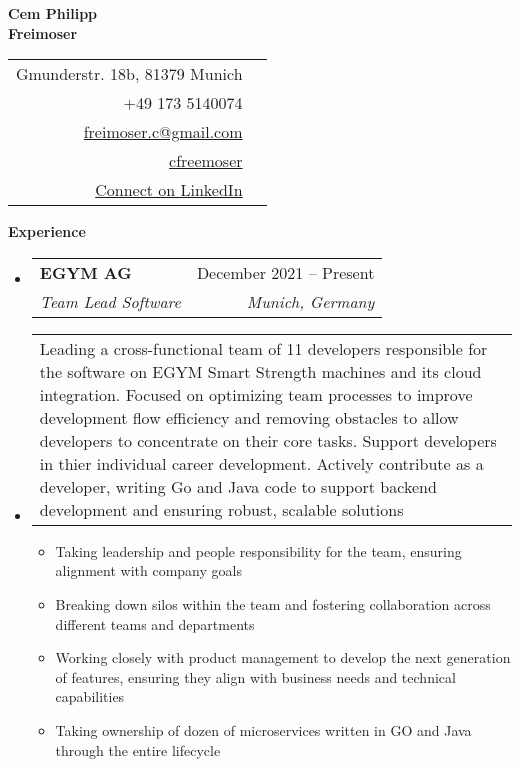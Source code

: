 \documentclass[letterpaper,12pt]{article}
\makeatletter
\def \firstname {Cem Philipp}
\def \lastname {Freimoser}
\def \linkedinicon {\faLinkedin}
\def \linkedintext {/dwight-schrute}
\def \homeicon {\faHome}
\def \hometext {Gmunderstr. 18b, 81379 Munich}
\def \phoneicon {\faPhone}
\def \phonetext {+49 173 5140074}
\def \emailicon {\faEnvelope}
\def \emaillink {mailto:freimoser.c@gmail.com}
\def \emailtext {freimoser.c@gmail.com}
\def \githubicon {\faGithub}
\def \githublink {https://github.com/cfreemoser}
\def \githubtext {cfreemoser}
\def \linkedinicon {\faLinkedin}
\def \linkedlink {https://www.linkedin.com/in/cem-philipp-freimoser-3b885011b/}
\def \linkedintext {Connect on LinkedIn}
\def \entryspacing {-0pt}
\def \phone {\phonetext \hspace{3pt}\phoneicon}
\def \email {\href{\emaillink}{\emailtext} \hspace{3pt}\emailicon}
\def \github {\href{\githublink}{\githubtext} \hspace{3pt}\githubicon}
\def \home {\hometext \hspace{3pt}\homeicon}
\def \linkedin {\href{\linkedlink}{\linkedintext} \hspace{3pt}\linkedinicon}
\renewcommand{\section}[2]{\vspace{5pt}
  \colorbox{teriary}{\color{white}\raggedbottom\normalsize\textbf{{#1}{\hspace{7pt}#2}}}
}
\newcommand{\resumeEntryStart}{\begin{itemize}[leftmargin=2.5mm]}
\newcommand{\resumeEntryEnd}{\end{itemize}\vspace{\entryspacing}}
\newcommand{\resumeItemListStart}{\begin{itemize}[leftmargin=4.5mm]}
\newcommand{\resumeItemListEnd}{\end{itemize}}
\newcommand{\resumeItem}[1]{
  \item\small{
    {#1 \vspace{-2pt}}
  }
}
\newcommand{\resumeEntryTSDL}[4]{
  \vspace{-1pt}\item[]
    \begin{tabularx}{0.97\textwidth}{X@{\hspace{60pt}}r}
      \textbf{\color{primary}#1} & {\color{accent}\small#2} \\
      \textit{\color{accent}\small#3} & \textit{\color{accent}\small#4} \\
    \end{tabularx}\vspace{-6pt}
}
\newcommand{\resumeEntryDesc}[1]{
  \vspace{-1pt}\item[] 
  \small{
    \begin{tabularx}{0.97\textwidth}{X}
      #1
    \end{tabularx}
  }
  \vspace{-6pt}
}
\makeatother
\begin{document}


\vspace{1cm} 
\begin{multicols}{2}
  \vspace{2cm}
  \textbf{\fontsize{28}{36}\selectfont \firstname}\\
  \textbf{\fontsize{28}{36}\selectfont  \lastname}
  
  \columnbreak
  
  \vspace{2cm}
  \begin{flushright}
      \begin{tabular}{rl}
          \home \\
          \phone \\
          \email \\
          \github \\
          \linkedin \\

       \end{tabular}
  \end{flushright}
\end{multicols}
\vspace{1cm}
\section{\faBusinessTime}{Experience}

  \resumeEntryStart
    \resumeEntryTSDL
      {EGYM AG}{December 2021 -- Present}
      {Team Lead Software}{Munich, Germany}
    \resumeEntryDesc{Leading a cross-functional team of 11 developers responsible for the software on EGYM Smart Strength machines and its cloud integration. Focused on optimizing team processes to improve development flow efficiency and removing obstacles to allow developers to concentrate on their core tasks. Support developers in thier individual career development. Actively contribute as a developer, writing Go and Java code to support backend development and ensuring robust, scalable solutions}
    \resumeItemListStart
    \resumeItem {Taking leadership and people responsibility for the team, ensuring alignment with company goals}
    \resumeItem {Breaking down silos within the team and fostering collaboration across different teams and departments}
    \resumeItem {Working closely with product management to develop the next generation of features, ensuring they align with business needs and technical capabilities}
    \resumeItem {Taking ownership of dozen of microservices written in GO and Java through the entire lifecycle}
    \resumeItemListEnd
  \resumeEntryEnd
\end{document}
